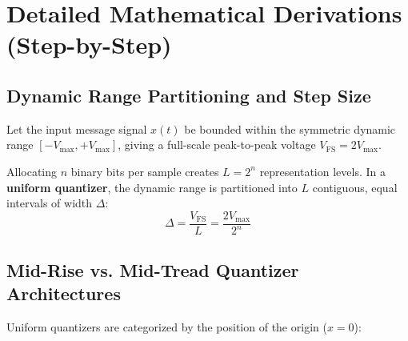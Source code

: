 \documentclass[11pt,a4paper]{article}
\begin{document}
\begin{center}
\end{center}

\section{Detailed Mathematical Derivations (Step-by-Step)}

\subsection{Dynamic Range Partitioning and Step Size}
Let the input message signal $x(t)$ be bounded within the symmetric dynamic range $[-V_{\max}, +V_{\max}]$, giving a full-scale peak-to-peak voltage $V_{\mathrm{FS}} = 2 V_{\max}$. 

Allocating $n$ binary bits per sample creates $L = 2^n$ representation levels. In a \textbf{uniform quantizer}, the dynamic range is partitioned into $L$ contiguous, equal intervals of width $\Delta$:
\begin{equation}
\Delta = \frac{V_{\mathrm{FS}}}{L} = \frac{2 V_{\max}}{2^n}
\end{equation}

\subsection{Mid-Rise vs. Mid-Tread Quantizer Architectures}
Uniform quantizers are categorized by the position of the origin ($x = 0$):
\end{document}
